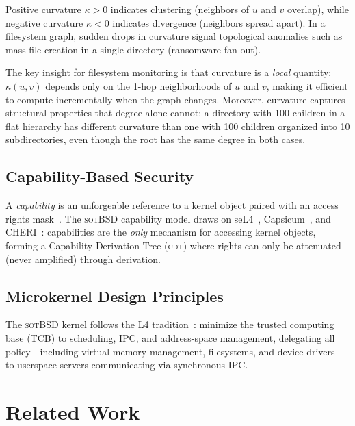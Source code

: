 \documentclass[11pt,a4paper]{article}
\theoremstyle{definition}
\theoremstyle{remark}
\newcommand{\sotbsd}{\textsc{sotBSD}}
\newcommand{\CDT}{\textsc{cdt}}
\newcommand{\OR}{\ensuremath{\kappa}}  %
\begin{document}
Positive curvature $\OR > 0$ indicates clustering (neighbors of $u$
and $v$ overlap), while negative curvature $\OR < 0$ indicates
divergence (neighbors spread apart). In a filesystem graph, sudden
drops in curvature signal topological anomalies such as mass file
creation in a single directory (ransomware fan-out).

The key insight for filesystem monitoring is that curvature is a
\emph{local} quantity: $\OR(u, v)$ depends only on the 1-hop
neighborhoods of $u$ and $v$, making it efficient to compute
incrementally when the graph changes. Moreover, curvature captures
structural properties that degree alone cannot: a directory with 100
children in a flat hierarchy has different curvature than one with 100
children organized into 10 subdirectories, even though the root has
the same degree in both cases.

\subsection{Capability-Based Security}
\label{sec:bg-caps}

A \emph{capability} is an unforgeable reference to a kernel object
paired with an access rights mask~\cite{dennis1966}. The
\sotbsd{} capability model draws on seL4~\cite{klein2009},
Capsicum~\cite{watson2010}, and CHERI~\cite{woodruff2014}: capabilities
are the \emph{only} mechanism for accessing kernel objects, forming a
Capability Derivation Tree (\CDT{}) where rights can only be
attenuated (never amplified) through derivation.

\subsection{Microkernel Design Principles}
\label{sec:bg-ukernel}

The \sotbsd{} kernel follows the L4 tradition~\cite{liedtke1993}:
minimize the trusted computing base (TCB) to scheduling, IPC, and
address-space management, delegating all policy---including virtual
memory management, filesystems, and device drivers---to userspace
servers communicating via synchronous IPC.

\section{Related Work}
\label{sec:related}
\end{document}
